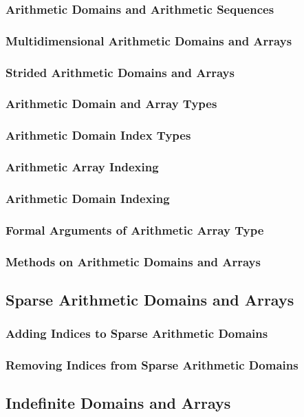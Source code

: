 \documentclass[10pt,twoside,titlepage]{article}
\begin{document}
\subsubsection{Arithmetic Domains and Arithmetic Sequences}
\subsubsection{Multidimensional Arithmetic Domains and Arrays}
\subsubsection{Strided Arithmetic Domains and Arrays}
\subsubsection{Arithmetic Domain and Array Types}
\subsubsection{Arithmetic Domain Index Types}
\subsubsection{Arithmetic Array Indexing}
\subsubsection{Arithmetic Domain Indexing}
\subsubsection{Formal Arguments of Arithmetic Array Type}
\subsubsection{Methods on Arithmetic Domains and Arrays}
\subsection{Sparse Arithmetic Domains and Arrays}
\subsubsection{Adding Indices to Sparse Arithmetic Domains}
\subsubsection{Removing Indices from Sparse Arithmetic Domains}
\subsection{Indefinite Domains and Arrays}
\end{document}
